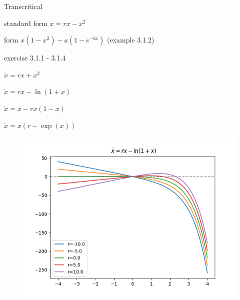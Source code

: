 \documentclass[9pt,aspectratio=43,mathserif,table]{beamer}
\begin{document}
\begin{frame} {Transcritical}
  \begin{multicols}{2}
   standard form  $\dot x = rx - x^2$

   \medskip

   form $x(1-x^2) - a(1-e^{-bx})$ (example 3.1.2)

   \medskip

   exercise 3.1.1 - 3.1.4

   $\dot x = r x + x ^ 2$

   $\dot x = r  x - \ln(1+x)$

   $\dot x = x - r  x  (1-x)$

   $\dot x = x  (r - \exp(x))$

    \begin{figure}[!h]
      \centering
      \includegraphics[width=.5\textwidth]{fig/transcritical-1.png}
    \end{figure}
 
   \end{multicols}

\end{frame}
\end{document}
